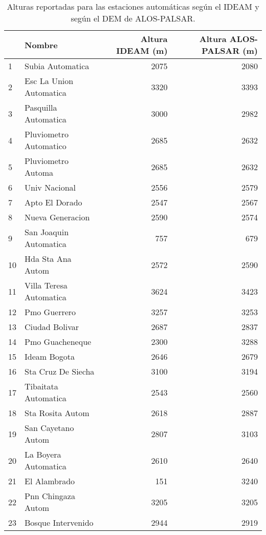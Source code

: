 \begin{table}[H]
\centering
\caption{Alturas reportadas para las estaciones automáticas según el IDEAM y según el DEM de ALOS-PALSAR.}
\label{tab:alturas_ideam_alos_2}
\begin{tabular}{llrr}
\toprule
{} &                    Nombre &  Altura IDEAM (m) &  Altura ALOS-PALSAR (m) \\
\midrule
1    &         Subia Automatica  &      2075 &     2080 \\
2  &   Esc La Union Automatica &      3320 &     3393 \\
3  &     Pasquilla Automatica  &      3000 &     2982 \\
4  &   Pluviometro Automatico  &      2685 &     2632 \\
5  &       Pluviometro Automa  &      2685 &     2632 \\
6  &            Univ Nacional  &      2556 &     2579 \\
7  &           Apto El Dorado  &      2547 &     2567 \\
8  &         Nueva Generacion  &      2590 &     2574 \\
9  &   San Joaquin Automatica  &       757 &      679 \\
10 &        Hda Sta Ana Autom  &      2572 &     2590 \\
11 &  Villa Teresa Automatica  &      3624 &     3423 \\
12 &             Pmo Guerrero  &      3257 &     3253 \\
13 &           Ciudad Bolivar  &      2687 &     2837 \\
14 &          Pmo Guacheneque  &      2300 &     3288 \\
15 &             Ideam Bogota  &      2646 &     2679 \\
16 &       Sta Cruz De Siecha  &      3100 &     3194 \\
17 &     Tibaitata Automatica  &      2543 &     2560 \\
18 &        Sta Rosita Autom   &      2618 &     2887 \\
19 &      San Cayetano Autom   &      2807 &     3103 \\
20 &     La Boyera Automatica  &      2610 &     2640 \\
21 &           El Alambrado    &       151 &     3240 \\
22 &      Pnn Chingaza Autom   &      3205 &     3205 \\
23 &     Bosque Intervenido    &      2944 &     2919 \\

\end{tabular}
\end{table}

